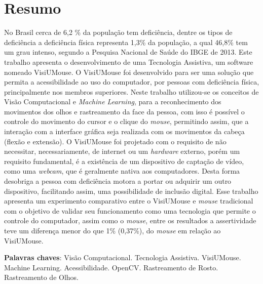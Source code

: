 \chapter*{Resumo}

\begin{singlespace}
{\fontsize{12pt}{\baselineskip} \selectfont \noindent
No Brasil cerca de 6,2 \% da população tem deficiência, dentre os tipos de deficiência a deficiência física representa 1,3\% da população, a qual 46,8\% tem um grau intenso, segundo a Pesquisa  Nacional de Saúde do IBGE de 2013. Este trabalho apresenta o desenvolvimento de uma Tecnologia Assistiva, um software nomeado VisiUMouse. O VisiUMouse foi desenvolvido para ser uma solução que permita a acessibilidade ao uso do computador, por pessoas com deficiência física, principalmente nos membros superiores. Neste trabalho utilizou-se os conceitos de Visão Computacional e \textit{Machine Learning}, para a reconhecimento dos movimentos dos olhos e rastreamento da face da pessoa, com isso é possível o controle do movimento do cursor e o clique do \textit{mouse}, permitindo assim, que a interação com a interface gráfica seja realizada com os movimentos da cabeça (flexão e extensão). O VisiUMouse foi projetado com o requisito de não necessitar, necessariamente, de internet ou um \textit{hardware} externo, porém um requisito fundamental, é a existência de um dispositivo de captação de vídeo, como uma \textit{webcam}, que é geralmente nativa aos computadores. Desta forma desobriga a pessoa com deficiência motora a portar ou adquirir um outro dispositivo, facilitando assim, uma possibilidade de inclusão digital. Esse trabalho apresenta um experimento comparativo entre o VisiUMouse e \textit{mouse} tradicional com o objetivo de validar seu funcionamento como uma tecnologia que permite o controle do computador, assim como o \textit{mouse}, entre os resultados a assertividade teve um diferença menor do que 1\% (0,37\%), do \textit{mouse} em relação ao VisiUMouse.
}
\end{singlespace}

\begin{singlespace}
\noindent \onehalfspacing
\textbf{Palavras chaves}: Visão Computacional. Tecnologia Assistiva. VisiUMouse. Machine Learning. Acessibilidade. OpenCV. Rastreamento de Rosto. Rastreamento de Olhos.
\end{singlespace}


